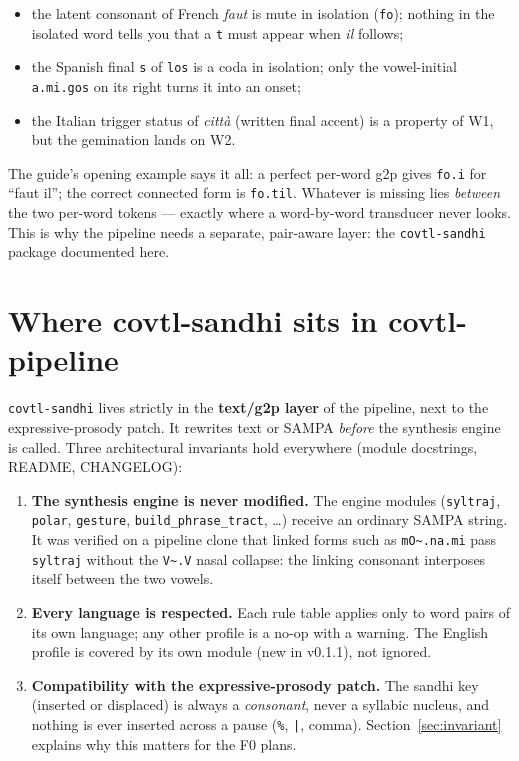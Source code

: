 \documentclass[11pt,a4paper]{report}
\newcommand{\smp}[1]{\texttt{#1}}          %
\newcommand{\tld}{\textasciitilde{}}      %
\newcommand{\pkg}{\texttt{covtl-sandhi}}
\begin{document}
\begin{itemize}[nosep]
  \item the latent consonant of French \emph{faut} is mute in isolation
        (\smp{fo}); nothing in the isolated word tells you that a \smp{t}
        must appear when \emph{il} follows;
  \item the Spanish final \smp{s} of \smp{los} is a coda in isolation; only
        the vowel-initial \smp{a.mi.gos} on its right turns it into an onset;
  \item the Italian trigger status of \emph{citt\`a} (written final accent)
        is a property of W1, but the gemination lands on W2.
\end{itemize}

The guide's opening example says it all: a perfect per-word g2p gives
\smp{fo.i} for ``faut il''; the correct connected form is \smp{fo.til}.
Whatever is missing lies \emph{between} the two per-word tokens — exactly
where a word-by-word transducer never looks. This is why the pipeline needs a
separate, pair-aware layer: the \pkg{} package documented here.

\section{Where covtl-sandhi sits in covtl-pipeline}

\pkg{} lives strictly in the \textbf{text/g2p layer} of the pipeline, next to
the expressive-prosody patch. It rewrites text or SAMPA \emph{before} the
synthesis engine is called. Three architectural invariants hold everywhere
(module docstrings, README, CHANGELOG):

\begin{enumerate}
  \item \textbf{The synthesis engine is never modified.} The engine modules
        (\smp{syltraj}, \smp{polar}, \smp{gesture}, \smp{build\_phrase\_tract},
        \dots) receive an ordinary SAMPA string. It was verified on a pipeline
        clone that linked forms such as \smp{mO\tld.na.mi} pass
        \smp{syltraj} without the \smp{V\tld.V} nasal collapse: the linking
        consonant interposes itself between the two vowels.
  \item \textbf{Every language is respected.} Each rule table applies only to
        word pairs of its own language; any other profile is a no-op with a
        warning. The English profile is covered by its own module (new in
        v0.1.1), not ignored.
  \item \textbf{Compatibility with the expressive-prosody patch.} The sandhi
        key (inserted or displaced) is always a \emph{consonant}, never a
        syllabic nucleus, and nothing is ever inserted across a pause
        (\smp{\%}, \smp{|}, comma). Section~\ref{sec:invariant} explains why
        this matters for the F0 plans.
\end{enumerate}
\end{document}
